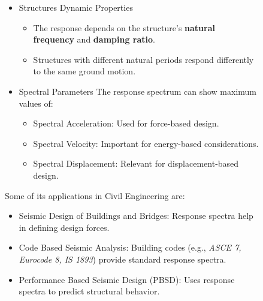 \documentclass[9pt]{extarticle}
\begin{document}
\begin{figure}[H]
\begin{minipage}{0.6\textwidth}
\begin{itemize}[noitemsep, topsep=0pt, leftmargin=*]
    \item Structures Dynamic Properties
    \begin{itemize}[noitemsep, topsep=0pt, leftmargin=*]
        \item The response depends on the structure’s \textbf{natural frequency} and \textbf{damping ratio}.
        \item Structures with different natural periods respond differently to the same ground motion.
    \end{itemize}

    \item Spectral Parameters
    The response spectrum can show maximum values of:
    \begin{itemize}[noitemsep, topsep=0pt, leftmargin=*]
        \item Spectral Acceleration: Used for force-based design.
        \item Spectral Velocity: Important for energy-based considerations.
        \item Spectral Displacement: Relevant for displacement-based design.
    \end{itemize}
\end{itemize}

\vspace{5mm}
\hspace*{\parindent} Some of its applications in Civil Engineering are:
\begin{itemize}[noitemsep, topsep=0pt, leftmargin=*]
    \item Seismic Design of Buildings and Bridges: Response spectra help in defining design forces.
    \item Code Based Seismic Analysis: Building codes (e.g., \textit{ASCE 7, Eurocode 8, IS 1893}) provide standard response spectra.
    \item Performance Based Seismic Design (PBSD): Uses response spectra to predict structural behavior.
\end{itemize}


\end{minipage}
\end{figure}
\end{document}
